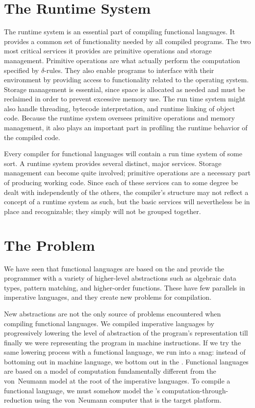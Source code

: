 \section{The Runtime System}
The runtime system is an essential part of compiling functional languages. It provides a common set of functionality needed by all compiled programs. The two most critical services it provides are primitive operations and storage management. Primitive operations are what actually perform the computation specified by $\delta$-rules. They also enable programs to interface with their environment by providing access to functionality related to the operating system. Storage management is essential, since space is allocated as needed and must be reclaimed in order to prevent excessive memory use. The run time system might also handle threading, bytecode interpretation, and runtime linking of object code. Because the runtime system oversees primitive operations and memory management, it also plays an important part in profiling the runtime behavior of the compiled code.

Every compiler for functional languages will contain a run time system of some sort. A runtime system provides several distinct, major services. Storage management can become quite involved; primitive operations are a necessary part of producing working code. Since each of these services can to some degree be dealt with independently of the others, the compiler's structure may not reflect a concept of a runtime system as such, but the basic services will nevertheless be in place and recognizable; they simply will not be grouped together.

\section{The Problem}
We have seen that functional languages are based on the \lambdacalc and provide the programmer with a variety of higher-level abstractions such as algebraic data types, pattern matching, and higher-order functions. These have few parallels in imperative languages, and they create new problems for compilation.

New abstractions are not the only source of problems encountered when compiling functional languages. We compiled imperative languages by progressively lowering the level of abstraction of the program's representation till finally we were representing the program in machine instructions. If we try the same lowering process with a functional language, we run into a snag: instead of bottoming out in machine language, we bottom out in the \lambdacalc{}. Functional languages are based on a model of computation fundamentally different from the von~Neumann model at the root of the imperative languages. To compile a functional language, we must somehow model the \lambdacalc{}'s computation-through-reduction using the von~Neumann computer that is the target platform.

